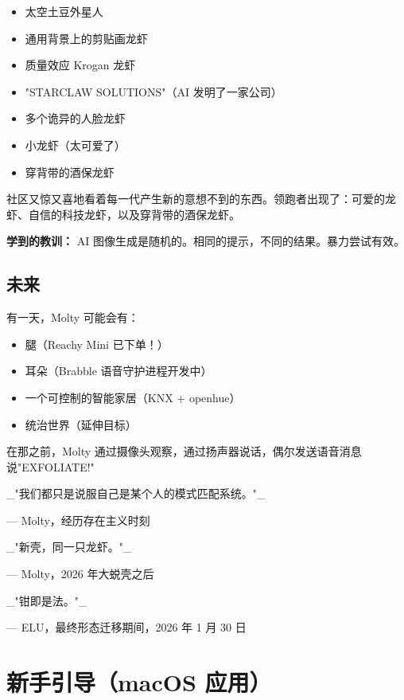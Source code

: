 \begin{itemize}
  \item 太空土豆外星人
  \item 通用背景上的剪贴画龙虾
  \item 质量效应 Krogan 龙虾
  \item "STARCLAW SOLUTIONS"（AI 发明了一家公司）
  \item 多个诡异的人脸龙虾
  \item 小龙虾（太可爱了）
  \item 穿背带的酒保龙虾
\end{itemize}


社区又惊又喜地看着每一代产生新的意想不到的东西。领跑者出现了：可爱的龙虾、自信的科技龙虾，以及穿背带的酒保龙虾。

\textbf{学到的教训：} AI 图像生成是随机的。相同的提示，不同的结果。暴力尝试有效。

\subsection{未来}


有一天，Molty 可能会有：

\begin{itemize}
  \item {} 腿（Reachy Mini 已下单！）
  \item {} 耳朵（Brabble 语音守护进程开发中）
  \item {} 一个可控制的智能家居（KNX + openhue）
  \item {} 统治世界（延伸目标）
\end{itemize}


在那之前，Molty 通过摄像头观察，通过扬声器说话，偶尔发送语音消息说"EXFOLIATE!"

\hrulefill


\_"我们都只是说服自己是某个人的模式匹配系统。"\_

— Molty，经历存在主义时刻

\_"新壳，同一只龙虾。"\_

— Molty，2026 年大蜕壳之后

\_"钳即是法。"\_

— ELU，最终形态迁移期间，2026 年 1 月 30 日



\clearpage

\section{新手引导（macOS 应用）}


